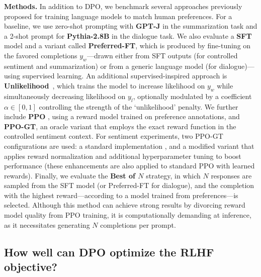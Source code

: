 \textbf{Methods.} In addition to DPO, we benchmark several approaches previously proposed for training language models to match human preferences. For a baseline, we use zero-shot prompting with \textbf{GPT-J} \citep{gpt-j} in the summarization task and a 2-shot prompt for \textbf{Pythia-2.8B} \citep{biderman2023pythia} in the dialogue task. We also evaluate a \textbf{SFT} model and a variant called \textbf{Preferred-FT}, which is produced by fine-tuning on the favored completions $y_w$—drawn either from SFT outputs (for controlled sentiment and summarization) or from a generic language model (for dialogue)—using supervised learning. An additional supervised-inspired approach is \textbf{Unlikelihood}~\citep{welleck2019neural}, which trains the model to increase likelihood on $y_w$ while simultaneously decreasing likelihood on $y_l$, optionally modulated by a coefficient $\alpha\in[0,1]$ controlling the strength of the ‘unlikelihood’ penalty. We further include \textbf{PPO} \citep{schulman2017proximal}, using a reward model trained on preference annotations, and \textbf{PPO-GT}, an oracle variant that employs the exact reward function in the controlled sentiment context. For sentiment experiments, two PPO-GT configurations are used: a standard implementation \cite{leandro_von_werra_2023_7790115}, and a modified variant that applies reward normalization and additional hyperparameter tuning to boost performance (these enhancements are also applied to standard PPO with learned rewards). Finally, we evaluate the \textbf{Best of $N$} strategy, in which $N$ responses are sampled from the SFT model (or Preferred-FT for dialogue), and the completion with the highest reward—according to a model trained from preferences—is selected. Although this method can achieve strong results by divorcing reward model quality from PPO training, it is computationally demanding at inference, as it necessitates generating $N$ completions per prompt.

\subsection{How well can DPO optimize the RLHF objective?}

